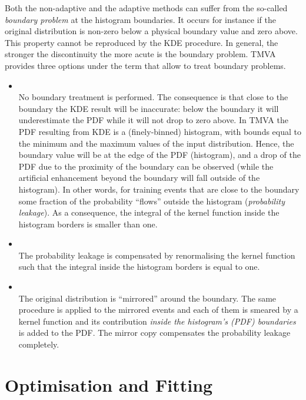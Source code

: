 Both the non-adaptive and the adaptive methods can suffer from the so-called {\em boundary 
problem} at the histogram boundaries. It occurs for instance if the original distribution is non-zero below a physical 
boundary value and zero above. This property cannot be reproduced by the KDE procedure. 
In general, the stronger the discontinuity the more acute is the boundary problem. TMVA 
provides three options under the term  that allow to treat boundary 
problems. 
\begin{itemize}

\item {} \\
      No boundary treatment is performed. The consequence is that 
      close to the boundary the KDE result will be inaccurate: below the boundary it will 
      underestimate the PDF while it will not drop to zero above. In TMVA the PDF resulting from 
      KDE is a (finely-binned) histogram, with bounds equal to the minimum and the maximum 
      values of the input distribution. Hence, the boundary value will be at the edge of the PDF 
      (histogram), and a drop of the PDF due to the proximity of the boundary can be observed
      (while the artificial enhancement beyond the boundary will fall outside of the histogram). 
      In other words, for training events that are close to the boundary some fraction of the 
      probability ``flows'' outside the histogram ({\em probability leakage}). As a consequence, 
      the integral of the kernel function inside the histogram borders is smaller than one.

\item {} \\
      The probability leakage is compensated by renormalising the 
      kernel function such that the integral inside the histogram borders is equal to one.

\item {} \\
      The original distribution is ``mirrored'' around the boundary. The same procedure is 
      applied to the mirrored events and each 
      of them is smeared by a kernel function and its contribution {\em inside the histogram's (PDF) 
      boundaries} is added to the PDF. The mirror copy compensates the probability 
      leakage completely.

\end{itemize}

\section{Optimisation and Fitting}
\label{sec:fitting}

